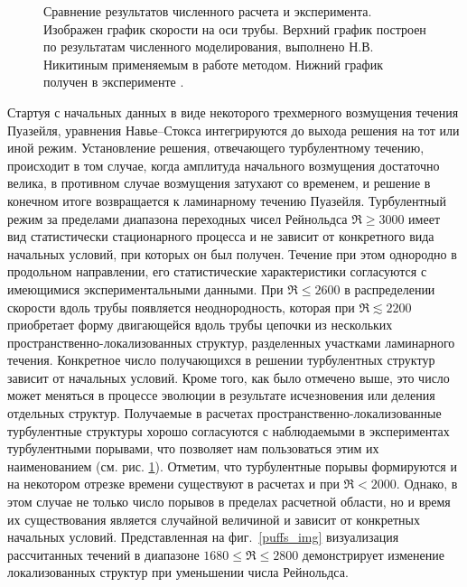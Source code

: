 \begin{figure}[h]
\caption{Сравнение результатов численного расчета и эксперимента. Изображен график скорости на оси трубы. Верхний график построен по результатам численного моделирования, выполнено Н.В. Никитиным применяемым в работе методом. Нижний график получен в эксперименте \cite{Wygnanski1973}.}
\label{exper_img}
\end{figure}

Стартуя с начальных данных в виде некоторого трехмерного возмущения течения Пуазейля, уравнения Навье--Стокса интегрируются до выхода решения на тот или иной режим. Установление решения, отвечающего турбулентному течению, происходит в том случае, когда амплитуда начального возмущения достаточно велика, в противном случае возмущения затухают со временем, и решение в конечном итоге возвращается к ламинарному течению Пуазейля. Турбулентный режим за пределами диапазона переходных чисел Рейнольдса $\Re \geqslant 3000$ имеет вид статистически стационарного процесса и не зависит от конкретного вида начальных условий, при которых он был получен. Течение при этом однородно в продольном направлении, его статистические характеристики согласуются с имеющимися экспериментальными данными. При $\Re \leqslant 2600$ в распределении скорости вдоль трубы появляется неоднородность, которая при $\Re \lesssim 2200$ приобретает форму двигающейся вдоль трубы цепочки из нескольких пространственно-локализованных структур, разделенных участками ламинарного течения. Конкретное число получающихся в решении турбулентных структур зависит от начальных условий. Кроме того, как было отмечено выше, это число может меняться в процессе эволюции в результате исчезновения или деления отдельных структур. Получаемые в расчетах пространственно-локализованные турбулентные структуры хорошо согласуются с наблюдаемыми в экспериментах турбулентными порывами, что позволяет нам пользоваться этим их наименованием (см. рис. \ref{exper_img}). Отметим, что турбулентные порывы формируются и на некотором отрезке времени существуют в расчетах и при $\Re < 2000$. Однако, в этом случае не только число порывов в пределах расчетной области, но и время их существования является случайной величиной и зависит от конкретных начальных условий. Представленная на фиг.~\ref{puffs_img} визуализация рассчитанных течений в диапазоне $1680 \leqslant \Re \leqslant 2800$ демонстрирует изменение локализованных структур при уменьшении числа Рейнольдса.

